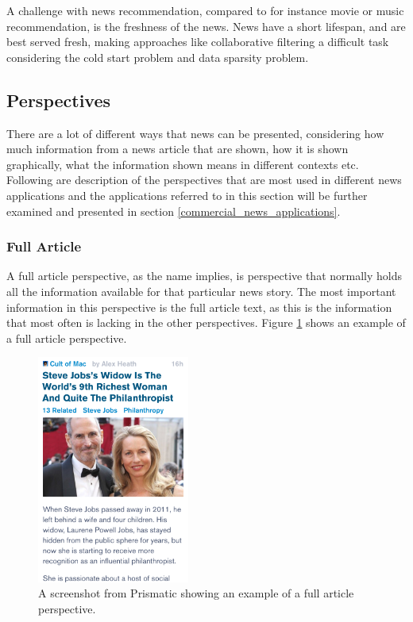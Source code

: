 A challenge with news recommendation, compared to for instance movie or music recommendation, is the freshness of the news. News have a short lifespan, and are best served fresh, making approaches like collaborative filtering a difficult task considering the cold start problem and data sparsity problem.

\subsection{Perspectives}
There are a lot of different ways that news can be presented, considering how much information from a news article that are shown, how it is shown graphically, what the information shown means in different contexts etc. Following are description of the perspectives that are most used in different news applications and the applications referred to in this section will be further examined and presented in section \ref{commercial_news_applications}.

\subsubsection{Full Article}
A full article perspective, as the name implies, is perspective that normally holds all the information available for that particular news story. The most important information in this perspective is the full article text, as this is the information that most often is lacking in the other perspectives. Figure \ref{full_article_prismatic} shows an example of a full article perspective.

\begin{figure}[!htbp]
\centering
\includegraphics[width=50mm]{GFX/perspectives/fullArticleViewPrismatic.png}
\caption{A screenshot from Prismatic showing an example of a full article perspective.}
\label{full_article_prismatic}
\end{figure}

